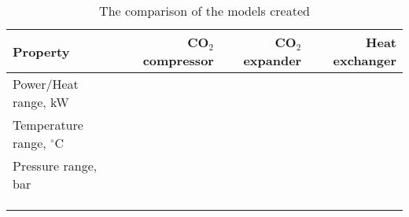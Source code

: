 \begin{table}
\label{tab:DiscussionComparison}
\caption{The comparison of the models created}
\begin{center}
\begin{tabulary}{0.9\textwidth}{LRRR}
\toprule
Property 	&	CO$_2$ compressor & CO$_2$	expander & Heat exchanger \\
\midrule
Power/Heat range, kW& & & \\
Temperature range, $^\circ$C& & & \\
Pressure range, bar& & & \\
& & & \\
& & & \\
& & & \\
\bottomrule
\end{tabulary}
\end{center}
\end{table}